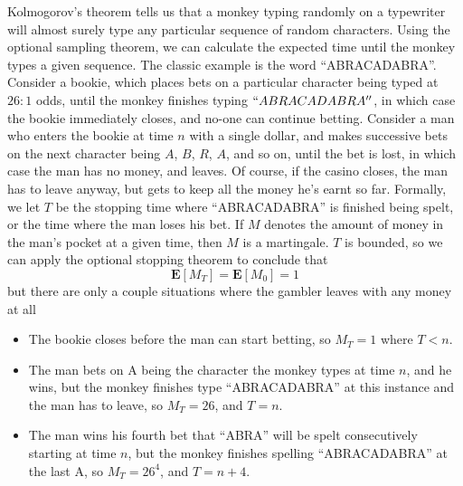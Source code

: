 \begin{example}
    Kolmogorov's theorem tells us that a monkey typing randomly on a typewriter will almost surely type any particular sequence of random characters. Using the optional sampling theorem, we can calculate the expected time until the monkey types a given sequence. The classic example is the word ``ABRACADABRA''. Consider a bookie, which places bets on a particular character being typed at $26:1$ odds, until the monkey finishes typing $``ABRACADABRA''$, in which case the bookie immediately closes, and no-one can continue betting. Consider a man who enters the bookie at time $n$ with a single dollar, and makes successive bets on the next character being $A$, $B$, $R$, $A$, and so on, until the bet is lost, in which case the man has no money, and leaves. Of course, if the casino closes, the man has to leave anyway, but gets to keep all the money he's earnt so far. Formally, we let $T$ be the stopping time where ``ABRACADABRA'' is finished being spelt, or the time where the man loses his bet. If $M$ denotes the amount of money in the man's pocket at a given time, then $M$ is a martingale. $T$ is bounded, so we can apply the optional stopping theorem to conclude that
    \[ \mathbf{E}[M_T] = \mathbf{E}[M_0] = 1 \]
    but there are only a couple situations where the gambler leaves with any money at all
    \begin{itemize}
        \item The bookie closes before the man can start betting, so $M_T = 1$ where $T < n$.

        \item The man bets on A being the character the monkey types at time $n$, and he wins, but the monkey finishes type ``ABRACADABRA'' at this instance and the man has to leave, so $M_T = 26$, and $T = n$.

        \item The man wins his fourth bet that ``ABRA'' will be spelt consecutively starting at time $n$, but the monkey finishes spelling ``ABRACADABRA'' at the last A, so $M_T = 26^4$, and $T = n+4$.


\end{itemize}
\end{example}
